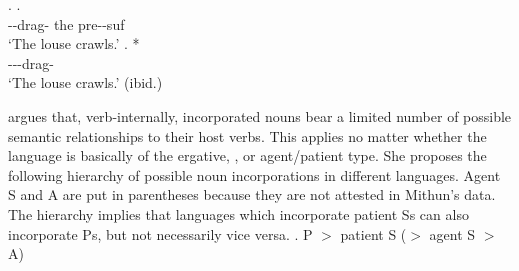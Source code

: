 \ex.
 \ag.    \\
	--drag- the {\sc pre}--{\sc suf} \\
	`The louse crawls.'
 \bg. * \\
	---drag- \\
	`The louse crawls.'
	\hfill{(ibid.)}

 argues that,
verb-internally, incorporated nouns bear a limited number of possible semantic relationships to their host verbs.
This applies no matter whether the language is basically of the ergative, , or agent{\slash}patient type.
She proposes the following hierarchy of possible noun incorporations in different languages.
Agent S and A are put in parentheses because they are not attested in Mithun's data.
The hierarchy implies that
languages which incorporate patient Ss can also incorporate Ps,
but not necessarily vice versa.
%
\ex. P $>$ patient S ($>$ agent S $>$ A)



